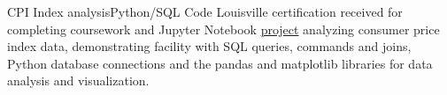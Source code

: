 {CPI Index analysis}{Python/SQL}
{Code Louisville certification received for completing coursework and Jupyter Notebook \href{https://github.com/jacobarchambault/cpi-python}{project} analyzing consumer price index data, demonstrating facility with SQL queries, commands and joins, 
	Python database connections and the pandas and matplotlib libraries for data analysis and visualization.}
